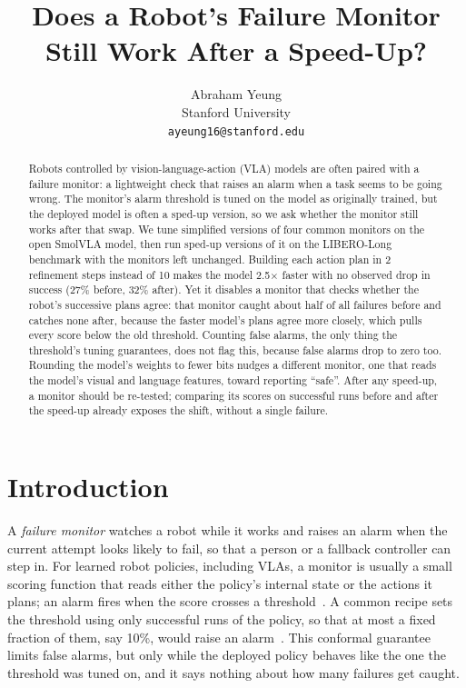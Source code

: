\documentclass{article}
\title{Does a Robot's Failure Monitor Still Work After a Speed-Up?}
\author{
  Abraham Yeung\\
  Stanford University\\
  \texttt{ayeung16@stanford.edu}
}
\begin{document}
\maketitle

\begin{abstract}
Robots controlled by vision-language-action (VLA) models are often paired with a failure
monitor: a lightweight check that raises an alarm when a task seems to be going wrong. The
monitor's alarm threshold is tuned on the model as originally trained, but the deployed model is
often a sped-up version, so we ask whether the monitor still works after that swap. We tune
simplified versions of four common monitors on the open SmolVLA model, then run sped-up versions of
it on the LIBERO-Long benchmark with the monitors left unchanged. Building each action plan in 2
refinement steps instead of 10 makes the model 2.5$\times$ faster with no observed drop in success
(27\% before, 32\% after). Yet it disables a monitor that checks whether the robot's successive
plans agree: that monitor caught about half of all failures before and catches none after, because the faster
model's plans agree more closely, which pulls every score below the old threshold. Counting false
alarms, the only thing the threshold's tuning guarantees, does not flag this, because false alarms
drop to zero too. Rounding the model's weights to fewer bits nudges a different monitor, one that
reads the model's visual and language features, toward reporting ``safe''. After any speed-up, a
monitor should be re-tested; comparing its scores on successful runs before and after the
speed-up already exposes the shift, without a single failure.
\end{abstract}


\section{Introduction}

A \emph{failure monitor} watches a robot while it works and raises an alarm when the current
attempt looks likely to fail, so that a person or a fallback controller can step in. For learned
robot policies, including VLAs, a monitor is usually a small scoring function that reads either
the policy's internal state or the actions it plans; an alarm fires when the score crosses a
threshold~\citep{safe,vlafail,fiper,sentinel}. A common recipe sets the threshold using only
successful runs of the policy, so that at most a fixed fraction of them, say 10\%, would raise an
alarm~\citep{safe,fiper,sentinel,faildetect}. This conformal guarantee~\citep{conformal} limits false alarms,
but only while the deployed policy behaves like the one the threshold was tuned on, and it says
nothing about how many failures get caught.
\end{document}
